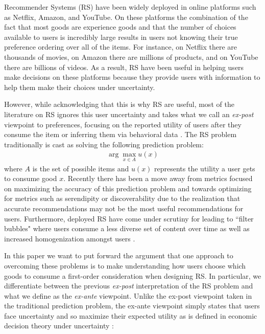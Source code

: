 \documentclass[sigconf]{acmart}
\begin{document}
Recommender Systems (RS) have been widely deployed in online platforms such as Netflix, Amazon, and YouTube. On these platforms the combination of the fact that most goods are experience goods and that the number of choices available to users is incredibly large results in users not knowing their true preference ordering over all of the items. For instance, on Netflix there are thousands of movies, on Amazon there are millions of products, and on YouTube there are billions of videos. As a result, RS have been useful in helping users make decisions on these platforms because they provide users with information to help them make their choices under uncertainty. 
\par
However, while acknowledging that this is why RS are useful, most of the literature on RS ignores this user uncertainty and takes what we call an \textit{ex-post} viewpoint to preferences, focusing on the reported utility of users after they consume the item or inferring them via behavioral data \cite{adomavicius2005toward, zhao2018interpreting}. The RS problem traditionally is cast as solving the following prediction problem:
\begin{align*}
\arg\max\limits_{x \in A} u(x)
\end{align*}
\noindent where $A$ is the set of possible items and $u(x)$ represents the utility a user gets to consume good $x$. Recently there has been a move away from metrics focused on maximizing the accuracy of this prediction problem and towards optimizing for metrics such as serendipity or discoverability \cite{mcnee2006being, vargas2011rank} due to  the realization that accurate recommendations may not be the most useful recommendations for users. Furthermore, deployed RS have come under scrutiny for leading to ``filter bubbles" \cite{pariser2011filter} where users consume a less diverse set of content over time as well as increased homogenization amongst users \cite{chaney2018algorithmic, hosanagar2013will}.
\par
In this paper we want to put forward the argument that one approach to overcoming these problems is to make understanding how users choose which goods to consume a first-order consideration when designing RS. In particular, we differentiate between the previous \textit{ex-post} interpretation of the RS problem and what we define as the \textit{ex-ante} viewpoint. Unlike the ex-post viewpoint taken in the traditional prediction problem, the ex-ante viewpoint simply states that users face uncertainty and so maximize their expected utility as is defined in economic decision theory under uncertainty \citep[see e.g.][]{mas1995microeconomic}:
\end{document}
